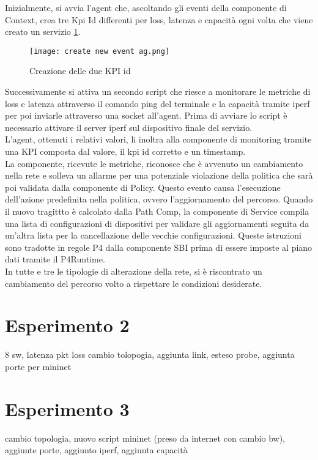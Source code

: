 Inizialmente, si avvia l'agent che, ascoltando gli eventi della componente di Context, crea tre Kpi Id differenti per loss, latenza e capacità ogni volta che viene creato un servizio \ref{fig:agent}.
\begin{figure}[h]
    \centering
   \texttt{[image: create new event ag.png]}
    \caption{Creazione delle due KPI id}
    \label{fig:agent}
\end{figure}
Successivamente si attiva un secondo script che riesce a monitorare le metriche di loss e latenza attraverso il comando ping del terminale e la capacità tramite iperf per poi inviarle attraverso una socket all'agent.
Prima di avviare lo script è necessario attivare il server iperf sul dispositivo finale del servizio.
\\L'agent, ottenuti i relativi valori, li inoltra alla componente di monitoring tramite una KPI composta dal valore, il kpi id corretto e un timestamp.
\\La componente, ricevute le metriche, riconosce che è avvenuto un cambiamento nella rete e solleva un allarme per una potenziale violazione della politica che sarà poi validata dalla componente di Policy.
Questo evento causa l'esecuzione dell'azione predefinita nella politica, ovvero l'aggiornamento del percorso.
Quando il nuovo tragittto è calcolato dalla Path Comp, la componente di Service compila una lista di configurazioni di dispositivi per validare gli aggiornamenti 
seguita da un'altra lista per la cancellazione delle vecchie configurazioni. Queste istruzioni sono tradotte in regole P4 dalla componente SBI prima di essere imposte al piano dati 
tramite il P4Runtime.
\\In tutte e tre le tipologie di alterazione della rete, si è riscontrato un cambiamento del percorso volto a rispettare le condizioni desiderate. 
\section{Esperimento 2}
8 sw, latenza pkt loss
cambio tolopogia, aggiunta link, esteso probe, aggiunta porte per mininet
\section{Esperimento 3}
cambio topologia, nuovo script mininet (preso da internet con cambio bw), aggiunte porte,
aggiunto iperf, aggiunta capacità 

